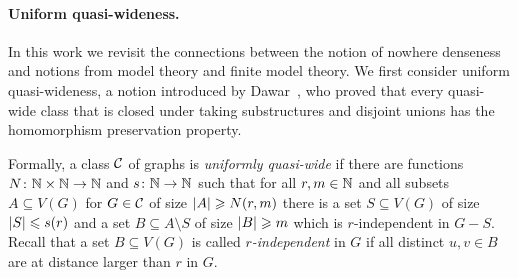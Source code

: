 \begin{comment}
These alternative characterizations have been very useful in 
the design of efficient algorithms. For instance, 
the {\sc{Subgraph Isomorphism}} and {\sc{Homomorphism}} problems 
are fixed-parameter tractable on any nowhere dense
class, parameterized by the size of the pattern graph~\cite{nevsetvril2010first}
and so is the {\sc Distance-$r$ Dominating Set} problem, parameterized
by the size of the solution~\cite{DawarK09}. In fact, 
the {\sc Distance-$r$ Dominating Set} problem admits
polynomial kernels~\cite{siebertz2016polynomial} and even 
almost linear kernels on nowhere dense classes of 
graphs~\cite{eickmeyer2016neighborhood}
(see also~\cite{drange2016kernelization} for the case $r=1$). 
It was shown in~\cite{grohe2014deciding}
that every first-order definable problem can be decided in
almost linear time on any nowhere dense graph class.

It is a natural question to ask for the most general classes of graphs
which admit efficient solutions for certain problems, or to 
classify them into tractable and intractable classes. It was shown 
that for the first-order model-checking problem~\cite{dvovrak2013testing} and for
the {\sc Distance-$r$ Dominating Set} problem~\cite{drange2016kernelization} 
the dividing line for algorithmic tractability 
on subgraph closed classes of graphs is exactly between the
nowhere dense and somewhere dense graph classes. 
\end{comment}

\paragraph{Uniform quasi-wideness.}

In this work we revisit the connections between the notion of nowhere 
denseness and notions from  model theory and finite model theory.
We first consider uniform quasi-wideness, a
notion  introduced by Dawar~\cite{dawar2010homomorphism}, who 
proved that every quasi-wide class that is closed under taking substructures
and disjoint unions has the homomorphism preservation property. 


Formally, a class $\mathcal{C}$ of graphs is \emph{uniformly quasi-wide} if there are
functions $N\colon \mathbb{N}\times\mathbb{N}\rightarrow \mathbb{N}$ and $s\colon \mathbb{N}\rightarrow \mathbb{N}$ such
that for all $r,m\in \mathbb{N}$ and all subsets $A\subseteq V(G)$ for
$G\in \mathcal{C}$ of size $\left\lvert A\right\rvert\geqslant N(r,m)$ there is a set
$S\subseteq V(G)$ of size $\left\lvert S\right\rvert\leqslant s(r)$ and a set
$B\subseteq A\setminus S$ of size $\left\lvert B\right\rvert\geqslant m$ which is $r$-independent in
$G-S$. Recall that a set $B\subseteq V(G)$ is called {\em{$r$-independent}} in $G$ if all
distinct $u,v\in B$ are at distance 
larger than $r$ in $G$.

